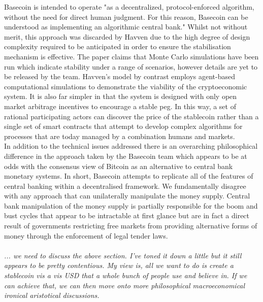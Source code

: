 \documentclass{article}
\begin{document}
\noindent Basecoin is intended to operate "as a decentralized, protocol-enforced algorithm, without the need for direct human judgment. For this reason, Basecoin can be understood as implementing an algorithmic central bank." Whilst not without merit, this approach was discarded by Havven due to the high degree of design complexity required to be anticipated in order to ensure the stabilisation mechanism is effective. The paper claims that Monte Carlo simulations have been run which indicate stability under a range of scenarios, however details are yet to be released by the team. Havven's model by contrast employs agent-based computational simulations to demonstrate the viability of the cryptoeconomic system. It is also far simpler in that the system is designed with only open market arbitrage incentives to encourage a stable peg. In this way, a set of rational participating actors can discover the price of the stablecoin rather than a single set of smart contracts that attempt to develop complex algorithms for processes that are today managed by a combination humans and markets. \\

\noindent In addition to the technical issues addressed there is an overarching philosophical difference in the approach taken by the Basecoin team which appears to be at odds with the consensus view of Bitcoin as an alternative to central bank monetary systems. In short, Basecoin attempts to replicate all of the features of central banking within a decentralised framework. We fundamentally disagree with any approach that can unilaterally manipulate the money supply. Central bank manipulation of the money supply is partially responsible for the boom and bust cycles that appear to be intractable at first glance but are in fact a direct result of governments restricting free markets from providing alternative forms of money through the enforcement of legal tender laws. \\ \\

\textit{... we need to discuss the above section. I've toned it down a little but it still appears to be pretty contentious. My view is, all we want to do is create a stablecoin vis a vis USD that a whole bunch of people use and believe in. If we can achieve that, we can then move onto more philosophical macroeconomical ironical aristotical discussions. }\\ \\
\end{document}
